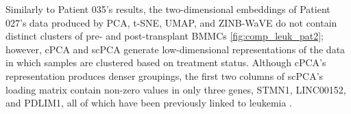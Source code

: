 Similarly to Patient 035's results, the two-dimensional embeddings of Patient 027's data produced by PCA, t-SNE, UMAP, and ZINB-WaVE do not contain distinct clusters of pre- and post-transplant BMMCs \ref{fig:comp_leuk_pat2}; however, cPCA and scPCA generate low-dimensional representations of the data in which samples are clustered based on treatment status. Although cPCA's representation produces denser groupings, the first two columns of scPCA's loading matrix contain non-zero values in only three genes, STMN1, LINC00152, and PDLIM1, all of which have been previously linked to leukemia \cite{Machado-Neto2014,Zhang2019,Holleman2004}. 